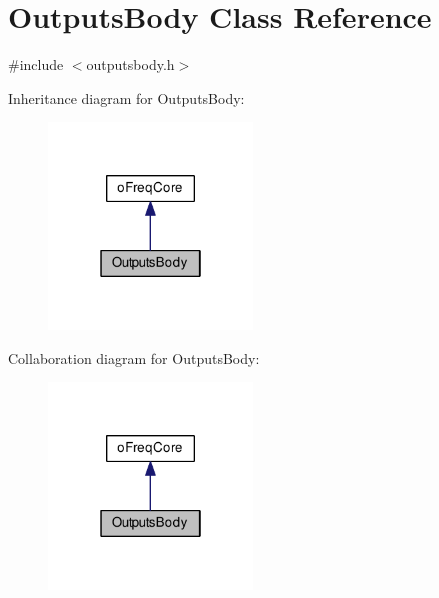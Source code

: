 \hypertarget{class_outputs_body}{\section{Outputs\-Body Class Reference}
\label{class_outputs_body}
}


{\ttfamily \#include $<$outputsbody.\-h$>$}



Inheritance diagram for Outputs\-Body\-:\nopagebreak
\begin{figure}[H]
\begin{center}
\leavevmode
\includegraphics[width=154pt]{class_outputs_body__inherit__graph}
\end{center}
\end{figure}


Collaboration diagram for Outputs\-Body\-:\nopagebreak
\begin{figure}[H]
\begin{center}
\leavevmode
\includegraphics[width=154pt]{class_outputs_body__coll__graph}
\end{center}
\end{figure}
